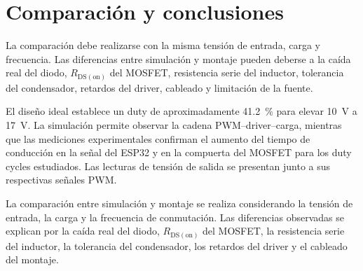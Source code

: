 \documentclass[12pt]{article}
\begin{document}
\section{Comparación y conclusiones}
La comparación debe realizarse con la misma tensión de entrada, carga y frecuencia. Las diferencias entre simulación y montaje pueden deberse a la caída real del diodo, $R_{\mathrm{DS(on)}}$ del MOSFET, resistencia serie del inductor, tolerancia del condensador, retardos del driver, cableado y limitación de la fuente.

El diseño ideal establece un duty de aproximadamente \SI{41.2}{\percent} para elevar \SI{10}{V} a \SI{17}{V}. La simulación permite observar la cadena PWM--driver--carga, mientras que las mediciones experimentales confirman el aumento del tiempo de conducción en la señal del ESP32 y en la compuerta del MOSFET para los duty cycles estudiados. Las lecturas de tensión de salida se presentan junto a sus respectivas señales PWM.

La comparación entre simulación y montaje se realiza considerando la tensión de entrada, la carga y la frecuencia de conmutación. Las diferencias observadas se explican por la caída real del diodo, $R_{\mathrm{DS(on)}}$ del MOSFET, la resistencia serie del inductor, la tolerancia del condensador, los retardos del driver y el cableado del montaje.
\end{document}
